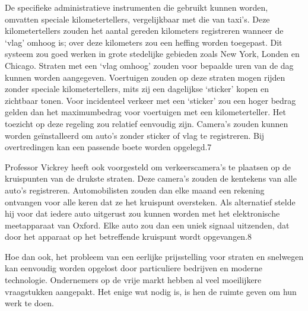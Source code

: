 \documentclass[
  a5paper,
  smalldemyvopaper,10pt,twoside,onecolumn,openright,extrafontsizes,hidelinks]{memoir}
\renewenvironment{quote}%
               {\list{}{\rightmargin=.6cm\leftmargin=.6cm}%
                \itshape \item[]}%
               {\endlist}
\begin{document}
\begin{quote}
De specifieke administratieve instrumenten die gebruikt kunnen worden,
omvatten speciale kilometertellers, vergelijkbaar met die van taxi's.
Deze kilometertellers zouden het aantal gereden kilometers registreren
wanneer de `vlag' omhoog is; over deze kilometers zou een heffing worden
toegepast. Dit systeem zou goed werken in grote stedelijke gebieden
zoals New York, Londen en Chicago. Straten met een `vlag omhoog' zouden
voor bepaalde uren van de dag kunnen worden aangegeven. Voertuigen
zouden op deze straten mogen rijden zonder speciale kilometertellers,
mits zij een dagelijkse `sticker' kopen en zichtbaar tonen. Voor
incidenteel verkeer met een `sticker' zou een hoger bedrag gelden dan
het maximumbedrag voor voertuigen met een kilometerteller. Het toezicht
op deze regeling zou relatief eenvoudig zijn. Camera's zouden kunnen
worden geïnstalleerd om auto's zonder sticker of vlag te registreren.
Bij overtredingen kan een passende boete worden opgelegd.7
\end{quote}

Professor Vickrey heeft ook voorgesteld om verkeerscamera's te plaatsen
op de kruispunten van de drukste straten. Deze camera's zouden de
kentekens van alle auto's registreren. Automobilisten zouden dan elke
maand een rekening ontvangen voor alle keren dat ze het kruispunt
oversteken. Als alternatief stelde hij voor dat iedere auto uitgerust
zou kunnen worden met het elektronische meetapparaat van Oxford. Elke
auto zou dan een uniek signaal uitzenden, dat door het apparaat op het
betreffende kruispunt wordt opgevangen.8

Hoe dan ook, het probleem van een eerlijke prijsstelling voor straten en
snelwegen kan eenvoudig worden opgelost door particuliere bedrijven en
moderne technologie. Ondernemers op de vrije markt hebben al veel
moeilijkere vraagstukken aangepakt. Het enige wat nodig is, is hen de
ruimte geven om hun werk te doen.
\end{document}
